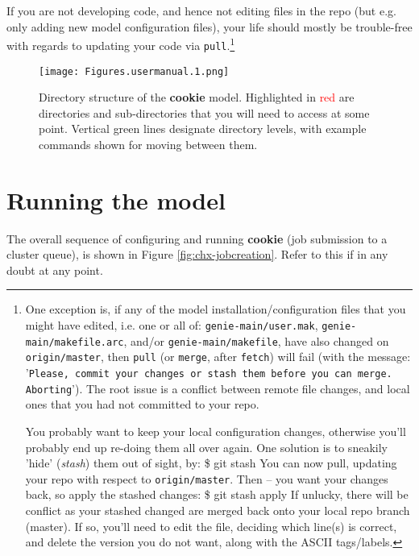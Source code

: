If you are not developing code, and hence not editing files in the repo (but e.g. only adding new model configuration files), your life should mostly be trouble-free with regards to updating your code via \texttt{pull}.\footnote{
One exception is, if any of the model installation/configuration files that you might have edited, i.e. one or all of: \texttt{genie-main/user.mak}, \texttt{genie-main/makefile.arc}, and/or \texttt{genie-main/makefile}, have also changed on \texttt{origin/master}, then \texttt{pull} (or \texttt{merge}, after \texttt{fetch}) will fail (with the message: '\texttt{Please, commit your changes or stash them before you can merge. Aborting}'). The root issue is a conflict between remote file changes, and local ones that you had not committed to your repo.

You probably want to keep your local configuration changes, otherwise you'll probably end up re-doing them all over again. One solution is to sneakily 'hide' (\textit{stash}) them out of sight, by:
\$ git stash
\noindent You can now pull, updating your repo with respect to \texttt{origin/master}. Then -- you want your changes back, so apply the stashed changes:
\$ git stash apply
If unlucky, there will be conflict as your stashed changed are merged back onto your local repo branch (master). If so, you'll need to edit the file, deciding which line(s) is correct, and delete the version you do not want, along with the ASCII tags/labels.
}


\begin{figure}
\texttt{[image: Figures.usermanual.1.png]}
\caption{Directory structure of the \textbf{cookie} model. Highlighted in \textcolor{red}{red} are directories and sub-directories that you will need to access at some point. Vertical \textcolor[rgb]{0,0.501961,0}{green} lines designate directory levels, with example commands shown for moving between them.}
\label{fig:directories}
\end{figure}

\newpage

\section{Running the model}

The overall sequence of configuring and running \textbf{cookie} (job submission to a cluster queue), is shown in Figure \ref{fig:chx-jobcreation}. Refer to this if in any doubt at any point.

